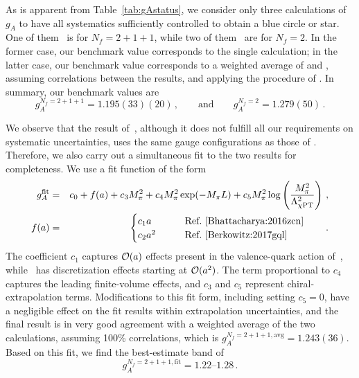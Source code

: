 As is apparent from Table~\ref{tab:gAstatus}, we consider 
only three calculations of $g_A$ to have all systematics
sufficiently controlled to obtain a blue circle or star.
%
One of them~\cite{Bhattacharya:2016zcn} is for $N_f=2+1+1$, while two of 
them~\cite{Capitani:2017qpc,Bali:2014nma} are for $N_f=2$.
%
In the former case, our benchmark value corresponds to the single calculation;
in the latter case, our benchmark value corresponds to a weighted average 
of \cite{Capitani:2017qpc} and \cite{Bali:2014nma}, assuming correlations
between the results, and applying the procedure of \cite{Schmelling:1994pz}.
%
In summary, our benchmark values are
\begin{equation}\label{eq:gAcriteria}
g_A^{N_f=2+1+1} = 1.195(33)(20)
\,,\qquad \mathrm{and}\qquad 
g_A^{N_f=2} = 1.279(50)\,.
\end{equation}

We observe that the result of~\cite{Berkowitz:2017gql}, although it does
not fulfill all our requirements on systematic uncertainties, uses the same 
gauge configurations as those of \cite{Bhattacharya:2016zcn}.
%
Therefore, we also carry out a simultaneous fit to the two results for
completeness.
%
We use a fit function of the form
\begin{eqnarray}
g_A^{\mathrm{fit}}
&=&
c_0 +
f(a) +
c_3M_\pi^2 +
c_4M_\pi^2 \exp(-M_\pi L) +
c_5M_\pi^2 \log\left(\frac{M_\pi^2}{\Lambda_{\chi \mathrm{PT}}^2}\right)\,,
\\
f(a) &=&
\begin{cases}
  c_1a   & \qquad \text{Ref.~\cite{Bhattacharya:2016zcn}} \\
  c_2a^2 & \qquad \text{Ref.~\cite{Berkowitz:2017gql}}\\
\end{cases}
\qquad .
\end{eqnarray}
%
The coefficient $c_1$ captures ${\cal O}(a)$ effects present in the
valence-quark action of~\cite{Bhattacharya:2016zcn}, while~\cite{Berkowitz:2017gql} 
has discretization effects starting at ${\cal O}(a^2)$. 
%
The term proportional to $c_4$ captures the leading finite-volume effects, and 
$c_3$ and $c_5$ represent chiral-extrapolation terms. 
%
Modifications to this fit form, including setting $c_5=0$, have a negligible 
effect on the fit results within extrapolation uncertainties, and the final 
result is in very good agreement with a weighted average of the two 
calculations, assuming 100\% correlations, which is 
$g_A^{N_f=2+1+1,\mathrm{avg}} = 1.243(36)$. 
%
Based on this fit, we find the best-estimate band of
\begin{equation}\label{eq:gAfit}
g_A^{N_f=2+1+1,\mathrm{fit}} = \numrange{1.22}{1.28}\,.
\end{equation}

